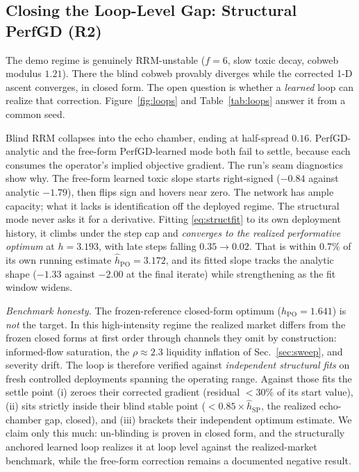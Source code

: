 \documentclass[sigconf,anonymous,review]{acmart}
\newcommand{\hPO}{h_{\mathrm{PO}}}
\begin{document}
\subsection{Closing the Loop-Level Gap: Structural PerfGD (R2)}
\label{sec:gap}
The demo regime is genuinely RRM-unstable ($f=6$, slow toxic decay, cobweb
modulus $1.21$). There the blind cobweb provably diverges while the corrected
1-D ascent converges, in closed form. The open question is whether a
\emph{learned} loop can realize that correction. Figure~\ref{fig:loops} and
Table~\ref{tab:loops} answer it from a common seed.

Blind RRM collapses into the echo chamber, ending at half-spread $0.16$.
PerfGD-analytic and the free-form PerfGD-learned mode both fail to settle,
because each consumes the operator's implied objective gradient. The run's
seam diagnostics show why. The free-form learned toxic slope starts
right-signed ($-0.84$ against analytic $-1.79$), then flips sign and hovers
near zero. The network has ample capacity; what it lacks is identification
off the deployed regime. The structural mode never asks it for a derivative.
Fitting \eqref{eq:structfit} to its own deployment history, it climbs under
the step cap and \emph{converges to the realized performative optimum} at
$h=3.193$, with late steps falling $0.35\to0.02$. That is within $0.7\%$ of
its own running estimate $\hat h_{\mathrm{PO}}=3.172$, and its fitted slope
tracks the analytic shape ($-1.33$ against $-2.00$ at the final iterate)
while strengthening as the fit window widens.

\emph{Benchmark honesty.} The frozen-reference closed-form optimum
($\hPO=1.641$) is \emph{not} the target. In this high-intensity regime the
realized market differs from the frozen closed forms at first order through
channels they omit by construction: informed-flow saturation, the
$\rho\approx2.3$ liquidity inflation of Sec.~\ref{sec:sweep}, and severity
drift. The loop is therefore verified against \emph{independent structural
fits} on fresh controlled deployments spanning the operating range. Against
those fits the settle point (i) zeroes their corrected gradient (residual
$<30\%$ of its start value), (ii) sits strictly inside their blind stable
point ($<0.85\times\hat h_{\mathrm{SP}}$, the realized echo-chamber gap,
closed), and (iii) brackets their independent optimum estimate. We claim only
this much: un-blinding is proven in closed form, and the structurally
anchored learned loop realizes it at loop level against the realized-market
benchmark, while the free-form correction remains a documented negative
result.
\end{document}
